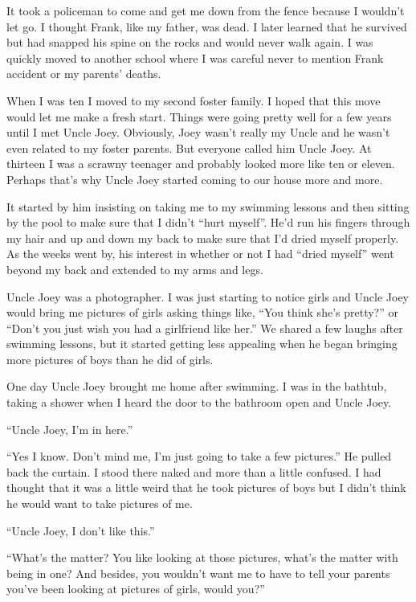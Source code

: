 \documentclass[12pt,letterpaper]{article}
\begin{document}
It took a policeman to come and get me down from the fence because I wouldn't let go. I thought Frank, like my father, was dead. I later learned that he survived but had snapped his spine on the rocks and would never walk again. I was quickly moved to another school where I was careful never to mention Frank accident or my parents' deaths.


When I was ten I moved to my second foster family. I hoped that this move would let me make a fresh start. Things were going pretty well for a few years until I met Uncle Joey. Obviously, Joey wasn't really my Uncle and he wasn't even related to my foster parents. But everyone called him Uncle Joey. At thirteen I was a scrawny teenager and probably looked more like ten or eleven. Perhaps that's why Uncle Joey started coming to our house more and more.

It started by him insisting on taking me to my swimming lessons and then sitting by the pool to make sure that I didn't ``hurt myself''. He'd run his fingers through my hair and up and down my back to make sure that I'd dried myself properly. As the weeks went by, his interest in whether or not I had ``dried myself'' went beyond my back and extended to my arms and legs.

Uncle Joey was a photographer. I was just starting to notice girls and Uncle Joey would bring me pictures of girls asking things like, ``You think she's pretty?'' or ``Don't you just wish you had a girlfriend like her.'' We shared a few laughs after swimming lessons, but it started getting less appealing when he began bringing more pictures of boys than he did of girls.

One day Uncle Joey brought me home after swimming. I was in the bathtub, taking a shower when I heard the door to the bathroom open and Uncle Joey.

``Uncle Joey, I'm in here.''

``Yes I know. Don't mind me, I'm just going to take a few pictures.'' He pulled back the curtain. I stood there naked and more than a little confused. I had thought that it was a little weird that he took pictures of boys but I didn't think he would want to take pictures of me.

``Uncle Joey, I don't like this.''

``What's the matter? You like looking at those pictures, what's the matter with being in one? And besides, you wouldn't want me to have to tell your parents you've been looking at pictures of girls, would  you?''
\end{document}
